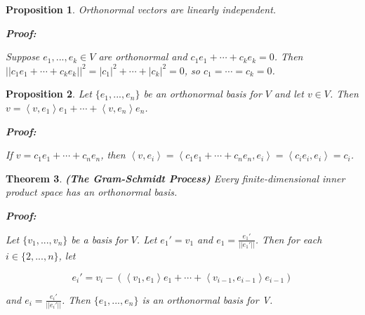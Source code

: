 \documentclass{article}
\theoremstyle{colontheorem}
\newtheorem{theorem}{Theorem}[section]
\newtheorem{proposition}[theorem]{Proposition}
\newenvironment{Theorem}
{
	\begin{mdframed}[backgroundcolor=TheoremOrange!10]
	\begin{theorem}
}
{
	\end{theorem}
	\end{mdframed}
	
	\vspace{.15in}
}
\newenvironment{Proposition}
{
	\begin{mdframed}[backgroundcolor=TheoremOrange!10]
	\begin{proposition}
}
{
	\end{proposition}
	\end{mdframed}
	
	\vspace{.15in}
}
\newenvironment{Proof}
{
	\begin{mdframed}[backgroundcolor=ProofPurple!10]
	\textbf{Proof:}%
}
{
	\end{mdframed}
	
	\vspace{.085in}
}
\begin{document}
\begin{Proposition}
	
	Orthonormal vectors are linearly independent.
	
	\begin{Proof}
		Suppose $e_1, ..., e_k \in V$ are orthonormal and $c_1 e_1 + \cdots + c_k e_k = 0$. Then $||c_1 e_1 + \cdots + c_k e_k||^2 = |c_1|^2 + \cdots + |c_k|^2 = 0$, so $c_1 = \cdots = c_k = 0$.
		
	\end{Proof}
	
\end{Proposition}



\begin{Proposition}
	
	Let $\{e_1, ..., e_n\}$ be an orthonormal basis for $V$ and let $v \in V$. Then $v = \left< v, e_1 \right> e_1 + \cdots + \left< v, e_n \right> e_n$.
	
	\begin{Proof}
		If $v = c_1 e_1 + \cdots + c_n e_n$, then $\left< v, e_i \right> = \left< c_1 e_1 + \cdots + c_n e_n, e_i \right> = \left< c_i e_i, e_i \right> = c_i$.
		
	\end{Proof}
	
\end{Proposition}



\begin{Theorem}
	
	\textbf{(The Gram-Schmidt Process)} Every finite-dimensional inner product space has an orthonormal basis.
	
	\begin{Proof}
		Let $\{v_1, ..., v_n\}$ be a basis for $V$. Let $e_1' = v_1$ and $e_1 = \frac{e_1'}{||e_1'||}$. Then for each $i \in \{2, ..., n\}$, let
		
		$$
			e_i' = v_i - \left( \left< v_1, e_1 \right> e_1 + \cdots + \left< v_{i-1}, e_{i-1} \right> e_{i-1} \right)
		$$ 
		
		and $e_i = \frac{e_i'}{||e_i'||}$. Then $\{e_1, ..., e_n\}$ is an orthonormal basis for V.
		
	\end{Proof}
	
\end{Theorem}
\end{document}
